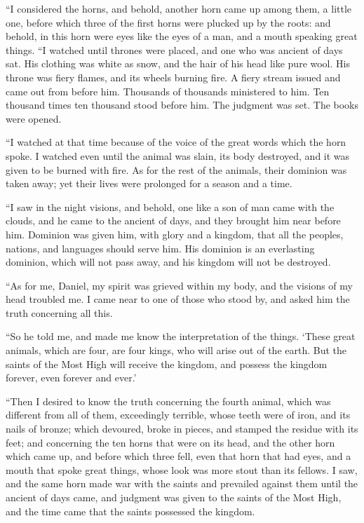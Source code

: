  ``I considered the horns, and behold, another horn came up
among them, a little one, before which three of the first horns were
plucked up by the roots: and behold, in this horn were eyes like the
eyes of a man, and a mouth speaking great things.  ``I
watched until thrones were placed, and one who was ancient of days sat.
His clothing was white as snow, and the hair of his head like pure wool.
His throne was fiery flames, and its wheels burning fire. 
A fiery stream issued and came out from before him. Thousands of
thousands ministered to him. Ten thousand times ten thousand stood
before him. The judgment was set. The books were opened.

 ``I watched at that time because of the voice of the great
words which the horn spoke. I watched even until the animal was slain,
its body destroyed, and it was given to be burned with fire.
 As for the rest of the animals, their dominion was taken
away; yet their lives were prolonged for a season and a time.

 ``I saw in the night visions, and behold, one like a son
of man came with the clouds, and he came to the ancient of days, and
they brought him near before him.  Dominion was given him,
with glory and a kingdom, that all the peoples, nations, and languages
should serve him. His dominion is an everlasting dominion, which will
not pass away, and his kingdom will not be destroyed.

 ``As for me, Daniel, my spirit was grieved within my body,
and the visions of my head troubled me.  I came near to one
of those who stood by, and asked him the truth concerning all this.

``So he told me, and made me know the interpretation of the things.
 `These great animals, which are four, are four kings, who
will arise out of the earth.  But the saints of the Most
High will receive the kingdom, and possess the kingdom forever, even
forever and ever.'

 ``Then I desired to know the truth concerning the fourth
animal, which was different from all of them, exceedingly terrible,
whose teeth were of iron, and its nails of bronze; which devoured, broke
in pieces, and stamped the residue with its feet;  and
concerning the ten horns that were on its head, and the other horn which
came up, and before which three fell, even that horn that had eyes, and
a mouth that spoke great things, whose look was more stout than its
fellows.  I saw, and the same horn made war with the saints
and prevailed against them  until the ancient of days came,
and judgment was given to the saints of the Most High, and the time came
that the saints possessed the kingdom.

